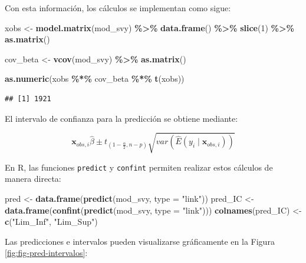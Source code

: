 \documentclass[
  spanish,
  12pt,
]{book}
\newenvironment{Shaded}{\begin{snugshade}}{\end{snugshade}}
\newcommand{\AttributeTok}[1]{\textcolor[rgb]{0.13,0.29,0.53}{#1}}
\newcommand{\DecValTok}[1]{\textcolor[rgb]{0.00,0.00,0.81}{#1}}
\newcommand{\FunctionTok}[1]{\textcolor[rgb]{0.13,0.29,0.53}{\textbf{#1}}}
\newcommand{\NormalTok}[1]{#1}
\newcommand{\OtherTok}[1]{\textcolor[rgb]{0.56,0.35,0.01}{#1}}
\newcommand{\SpecialCharTok}[1]{\textcolor[rgb]{0.81,0.36,0.00}{\textbf{#1}}}
\newcommand{\StringTok}[1]{\textcolor[rgb]{0.31,0.60,0.02}{#1}}
\begin{document}
Con esta información, los cálculos se implementan como sigue:

\begin{Shaded}
\begin{Highlighting}[]
\NormalTok{xobs }\OtherTok{\textless{}{-}} \FunctionTok{model.matrix}\NormalTok{(mod\_svy) }\SpecialCharTok{\%\textgreater{}\%}
        \FunctionTok{data.frame}\NormalTok{() }\SpecialCharTok{\%\textgreater{}\%} \FunctionTok{slice}\NormalTok{(}\DecValTok{1}\NormalTok{) }\SpecialCharTok{\%\textgreater{}\%} \FunctionTok{as.matrix}\NormalTok{()}

\NormalTok{cov\_beta }\OtherTok{\textless{}{-}} \FunctionTok{vcov}\NormalTok{(mod\_svy) }\SpecialCharTok{\%\textgreater{}\%} \FunctionTok{as.matrix}\NormalTok{()}

\FunctionTok{as.numeric}\NormalTok{(xobs }\SpecialCharTok{\%*\%}\NormalTok{ cov\_beta }\SpecialCharTok{\%*\%} \FunctionTok{t}\NormalTok{(xobs))}
\end{Highlighting}
\end{Shaded}

\begin{verbatim}
## [1] 1921
\end{verbatim}

El intervalo de confianza para la predicción se obtiene mediante:

\[
\boldsymbol{x}_{obs,i}\hat{\beta}\pm t_{\left(1-\frac{\alpha}{2},n-p\right)}\sqrt{var\left(\hat{E}\left(y_{i}\mid\boldsymbol{x}_{obs,i}\right)\right)}
\]

En R, las funciones \texttt{predict} y \texttt{confint} permiten realizar estos cálculos de manera directa:

\begin{Shaded}
\begin{Highlighting}[]
\NormalTok{pred }\OtherTok{\textless{}{-}} \FunctionTok{data.frame}\NormalTok{(}\FunctionTok{predict}\NormalTok{(mod\_svy, }\AttributeTok{type =} \StringTok{"link"}\NormalTok{))}
\NormalTok{pred\_IC }\OtherTok{\textless{}{-}} \FunctionTok{data.frame}\NormalTok{(}\FunctionTok{confint}\NormalTok{(}\FunctionTok{predict}\NormalTok{(mod\_svy, }\AttributeTok{type =} \StringTok{"link"}\NormalTok{)))}
\FunctionTok{colnames}\NormalTok{(pred\_IC) }\OtherTok{\textless{}{-}} \FunctionTok{c}\NormalTok{(}\StringTok{"Lim\_Inf"}\NormalTok{, }\StringTok{"Lim\_Sup"}\NormalTok{)}
\end{Highlighting}
\end{Shaded}

Las predicciones e intervalos pueden visualizarse gráficamente en la Figura \ref{fig:fig-pred-intervalos}:
\end{document}
